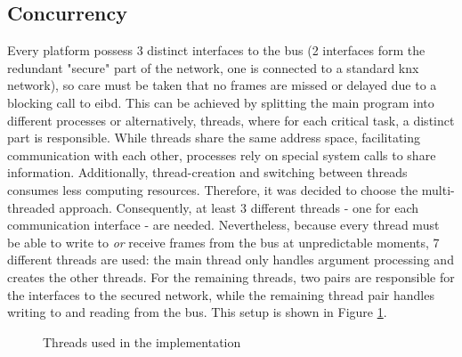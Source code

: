 \subsection{Concurrency}
Every platform possess 3 distinct interfaces to the bus (2 interfaces form the redundant "secure" part of the network, one is connected
to a standard \gls{knx} network), so care must be taken that no frames are missed or delayed due to a blocking call to \gls{eibd}. This can be achieved by splitting the main program into different 
processes or alternatively, threads, where for each critical task, a distinct part is responsible. While threads share the same address space, facilitating communication with
each other, processes rely on special system calls 
to share information. Additionally, thread-creation and switching between threads consumes less computing resources. Therefore, it was decided to choose the multi-threaded
approach. Consequently, at least 3 different threads - one for each communication interface - are needed. Nevertheless, because every thread must be able to write to \textit{or} receive
frames from the bus at unpredictable moments, 7 different threads are used: the main thread only handles argument processing and creates the other threads. For the remaining threads,
two pairs are responsible for the interfaces to the secured network, while the remaining thread pair handles writing to and reading from the bus. This setup is shown in
Figure \ref{fig:threads}.
\begin{figure}[h]
\centering
{}
\label{fig:threads}
\caption{Threads used in the implementation}
\end{figure}
